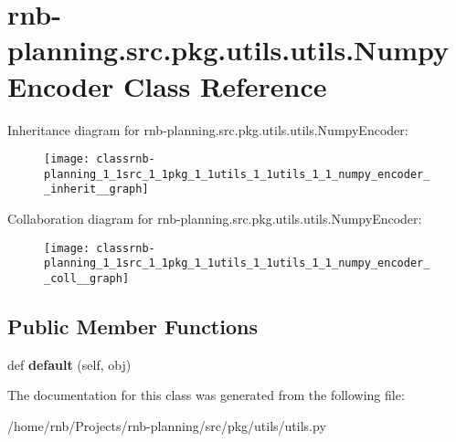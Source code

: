 \hypertarget{classrnb-planning_1_1src_1_1pkg_1_1utils_1_1utils_1_1_numpy_encoder}{}\section{rnb-\/planning.src.\+pkg.\+utils.\+utils.\+Numpy\+Encoder Class Reference}
\label{classrnb-planning_1_1src_1_1pkg_1_1utils_1_1utils_1_1_numpy_encoder}


Inheritance diagram for rnb-\/planning.src.\+pkg.\+utils.\+utils.\+Numpy\+Encoder\+:\nopagebreak
\begin{figure}[H]
\begin{center}
\leavevmode
\texttt{[image: classrnb-planning\_1\_1src\_1\_1pkg\_1\_1utils\_1\_1utils\_1\_1\_numpy\_encoder\_\_inherit\_\_graph]}
\end{center}
\end{figure}


Collaboration diagram for rnb-\/planning.src.\+pkg.\+utils.\+utils.\+Numpy\+Encoder\+:\nopagebreak
\begin{figure}[H]
\begin{center}
\leavevmode
\texttt{[image: classrnb-planning\_1\_1src\_1\_1pkg\_1\_1utils\_1\_1utils\_1\_1\_numpy\_encoder\_\_coll\_\_graph]}
\end{center}
\end{figure}
\subsection*{Public Member Functions}
\begin{DoxyCompactItemize}
\item 
\mbox{\label{classrnb-planning_1_1src_1_1pkg_1_1utils_1_1utils_1_1_numpy_encoder_a356086ad2d0e5d2249196f3b5e391722}} 
def {\bfseries default} (self, obj)
\end{DoxyCompactItemize}


The documentation for this class was generated from the following file\+:\begin{DoxyCompactItemize}
\item 
/home/rnb/\+Projects/rnb-\/planning/src/pkg/utils/utils.\+py\end{DoxyCompactItemize}
